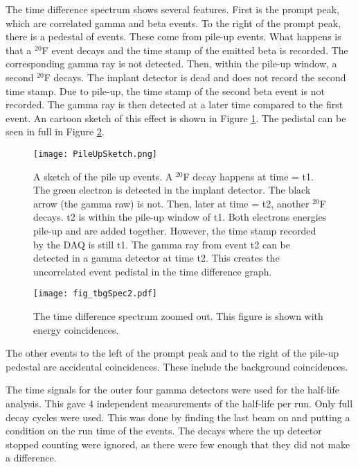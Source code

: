 The time difference spectrum shows several features.
First is the prompt peak, which are correlated gamma and beta events. 
To the right of the prompt peak, there is a pedestal of events.
These come from pile-up events.
What happens is that a $^{20}$F event decays and the time stamp of the emitted beta is recorded.
The corresponding gamma ray is not detected.
Then, within the pile-up window, a second $^{20}$F decays.  
The implant detector is dead and does not record the second time stamp.
Due to pile-up, the time stamp of the second beta event is not recorded.
The gamma ray is then detected at a later time compared to the first event.
An cartoon sketch of this effect is shown in Figure \ref{fig:PileUp}.
The pedistal can be seen in full in Figure \ref{fig:timediff2}.

\begin{figure}
	\centerline{\texttt{[image: PileUpSketch.png]}}
	\caption{A sketch of the pile up events.
		 A $^{20}$F decay happens at time = t1.
		 The green electron is detected in the implant detector.
		 The black arrow (the gamma raw) is not.
		 Then, later at time = t2, another $^{20}$F decays.
		 t2 is within the pile-up window of t1.
		 Both electrons energies pile-up and are added together.
		 However, the time stamp recorded by the DAQ is still t1.
		 The gamma ray from event t2 can be detected in a gamma detector at time t2.
		 This creates the uncorrelated event pedistal in the time difference graph.
		 }
	\label{fig:PileUp}
\end{figure}

\begin{figure}
	\centerline{\texttt{[image: fig\_tbgSpec2.pdf]}}	
	\caption{The time difference spectrum zoomed out.
		 This figure is shown with energy coincidences.}
	\label{fig:timediff2}
\end{figure}

The other events to the left of the prompt peak and to the right of the pile-up pedestal are accidental coincidences.
These include the background coincidences.

The time signals for the outer four gamma detectors were used for the half-life analysis.
This gave 4 independent measurements of the half-life per run. 
Only full decay cycles were used. 
This was done by finding the last beam on and putting a condition on the run time of the events.
The decays where the up detector stopped counting were ignored, as there were few enough that they did not make a difference. 

